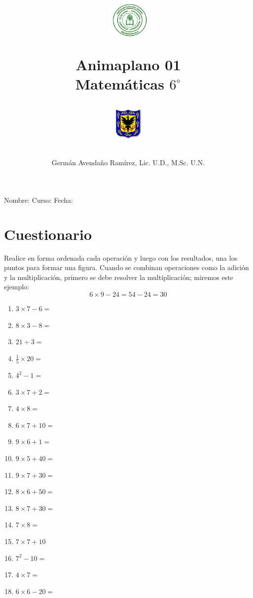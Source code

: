 \documentclass[10pt,twoside]{article}
\author{Germ\'an Avenda\~no Ram\'irez, Lic. U.D., M.Sc. U.N.}
\title{\begin{minipage}{.2\textwidth}
\includegraphics[height=1.75cm]{Images/logo-colegio.png}\end{minipage}
\begin{minipage}{.55\textwidth}
\begin{center}
Animaplano 01 \\
Matemáticas $6^{\circ}$
\end{center}
\end{minipage}\hfill
\begin{minipage}{.2\textwidth}
\includegraphics[height=1.75cm]{Images/logo-sed.png} 
\end{minipage}}
\date{}
\begin{document}
\maketitle
Nombre: \hrulefill Curso: \underline{\hspace*{44pt}} Fecha: \underline{\hspace*{2.5cm}}
\section*{Cuestionario}
Realice en forma ordenada cada operación y luego con los resultados, una los puntos para formar una figura. Cuando se combinan operaciones como la adición y la multiplicación, primero se debe resolver la multiplicación; miremos este ejemplo:
\[6\times 9-24=54-24=30\]
\begin{enumerate}
\item $3\times 7-6=$
\item $8\times 3-8=$
\item $21\div 3=$
\item $\frac{1}{5}\times 20=$
\item $4^{2}-1=$
\item $3\times 7+2=$
\item $4\times 8=$
\item $6\times 7+10=$
\item $9\times 6+1=$
\item $9\times 5 +40=$
\item $9\times 7+30=$
\item $8\times 6+50=$
\item $8\times 7+30=$
\item $7\times 8=$
\item $7\times 7+10$
\item $7^{2}-10=$
\item $4\times 7=$
\item $6\times 6-20=$
\end{enumerate}
\end{document}
